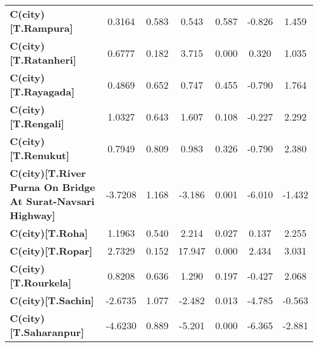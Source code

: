 \begin{center}
\begin{tabular}{lcccccc}
\textbf{C(city)[T.Rampura]}                                                                         &       0.3164  &        0.583     &     0.543  &         0.587        &       -0.826    &        1.459     \\
\textbf{C(city)[T.Ratanheri]}                                                                       &       0.6777  &        0.182     &     3.715  &         0.000        &        0.320    &        1.035     \\
\textbf{C(city)[T.Rayagada]}                                                                        &       0.4869  &        0.652     &     0.747  &         0.455        &       -0.790    &        1.764     \\
\textbf{C(city)[T.Rengali]}                                                                         &       1.0327  &        0.643     &     1.607  &         0.108        &       -0.227    &        2.292     \\
\textbf{C(city)[T.Renukut]}                                                                         &       0.7949  &        0.809     &     0.983  &         0.326        &       -0.790    &        2.380     \\
\textbf{C(city)[T.River Purna On Bridge At Surat-Navsari Highway]}                                  &      -3.7208  &        1.168     &    -3.186  &         0.001        &       -6.010    &       -1.432     \\
\textbf{C(city)[T.Roha]}                                                                            &       1.1963  &        0.540     &     2.214  &         0.027        &        0.137    &        2.255     \\
\textbf{C(city)[T.Ropar]}                                                                           &       2.7329  &        0.152     &    17.947  &         0.000        &        2.434    &        3.031     \\
\textbf{C(city)[T.Rourkela]}                                                                        &       0.8208  &        0.636     &     1.290  &         0.197        &       -0.427    &        2.068     \\
\textbf{C(city)[T.Sachin]}                                                                          &      -2.6735  &        1.077     &    -2.482  &         0.013        &       -4.785    &       -0.563     \\
\textbf{C(city)[T.Saharanpur]}                                                                      &      -4.6230  &        0.889     &    -5.201  &         0.000        &       -6.365    &       -2.881     \\

\end{tabular}
\end{center}
